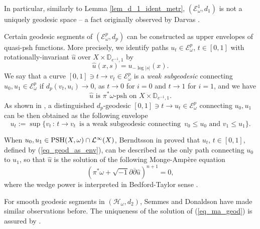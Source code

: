 \documentclass[12pt]{article}
\numberwithin{equation}{section}
\theoremstyle{theorem}
\theoremstyle{definition}
\theoremstyle{remark}
\newcommand{\imun} {\sqrt{-1}}
\newcommand{\dbar}{ \overline{\partial} }
\begin{document}
	In particular, similarly to Lemma \ref{lem_d_1_ident_metr}, $(\mathcal{E}_{\omega}^1, d_1)$ is not a uniquely geodesic space -- a fact originally observed by Darvas \cite[comment after Theorem 4.17]{DarvWeakGeod}.
	\par 
	Certain geodesic segments of $(\mathcal{E}_{\omega}^p, d_p)$ can be constructed as upper envelopes of quasi-psh functions. 
	More precisely, we identify paths $u_t \in \mathcal{E}_{\omega}^p$, $t \in [0, 1]$ with rotationally-invariant $\hat{u}$ over $X \times \mathbb{D}_{e^{-1}, 1}$ by 
	\begin{equation}\label{eq_defn_hat_u}
		\hat{u}(x, s) = u_{- \log |s|}(x).
	\end{equation}
	We say that a curve $[0,1] \ni t \to v_t \in \mathcal{E}_{\omega}^p$ is a \textit{weak subgeodesic} connecting $u_0, u_1 \in \mathcal{E}_{\omega}^p$ if $d_p(v_t, u_i) \to 0$, as $t \to 0$ for $i = 0$ and $t \to 1$ for $i = 1$, and we have
	\begin{equation}\label{eq_subgeod_req}
		\hat{u} \text{ is $\pi^* \omega$-psh on $X \times \mathbb{D}_{e^{-1}, 1}$.}
	\end{equation}	
	As shown in \cite[Theorem 2]{DarvasFinEnerg}, a distinguished $d_p$-geodesic $[0, 1] \ni t \to u_t \in \mathcal{E}_{\omega}^p$ connecting $u_0, u_1$ can be then obtained as the following envelope
	\begin{equation}\label{eq_geod_as_env}
		u_t := \sup \Big\{ 
			v_t \, : \, t \to v_t \,  \text{ is a weak subgeodesic connecting } \, v_0 \leq u_0 \text{ and } v_1 \leq u_1
		\Big\}.
	\end{equation}
	\par 
	When $u_0, u_1 \in {\rm{PSH}}(X, \omega) \cap \mathcal{L}^{\infty}(X)$, Berndtsson \cite[\S 2.2]{BernBrunnMink} in \cite[\S 2.2]{BernBrunnMink} proved that $u_t$, $t \in [0, 1]$, defined by (\ref{eq_geod_as_env}), can be described as the only path connecting $u_0$ to $u_1$, so that $\hat{u}$ is the solution of the following Monge-Ampère equation
	\begin{equation}\label{eq_ma_geod}
		(\pi^* \omega + \imun \partial \dbar \hat{u})^{n + 1} = 0,
	\end{equation}
	where the wedge power is interpreted in Bedford-Taylor sense \cite{BedfordTaylor}.
	\par 
	For smooth geodesic segments in $(\mathcal{H}_{\omega}, d_2)$, Semmes \cite{Semmes} and Donaldson \cite{DonaldSymSp} have made similar observations before.
	The uniqueness of the solution of (\ref{eq_ma_geod}) is assured by \cite[Lemma 5.25]{GuedjZeriahBook}.
\end{document}
